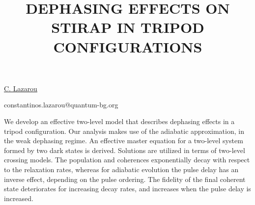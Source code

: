 \title{DEPHASING EFFECTS ON STIRAP IN TRIPOD CONFIGURATIONS}

\underline{C. Lazarou} 

{\normalsize{\vspace{-4mm}
\unisofia

\email constantinos.lazarou@quantum-bg.org}}

We develop an effective two-level model that describes dephasing effects in a tripod configuration.
Our analysis makes use of the adiabatic approximation, in the weak dephasing regime. An effective
master equation for a two-level system formed by two dark states is derived. Solutions are utilized
in terms of two-level crossing models. The population and coherences exponentially decay with
respect to the relaxation rates, whereas for adiabatic evolution the pulse delay has an inverse effect, depending on the pulse ordering. The fidelity of the final coherent state deteriorates for increasing decay rates, and increases when the pulse delay is increased.

\vspace{\baselineskip}
